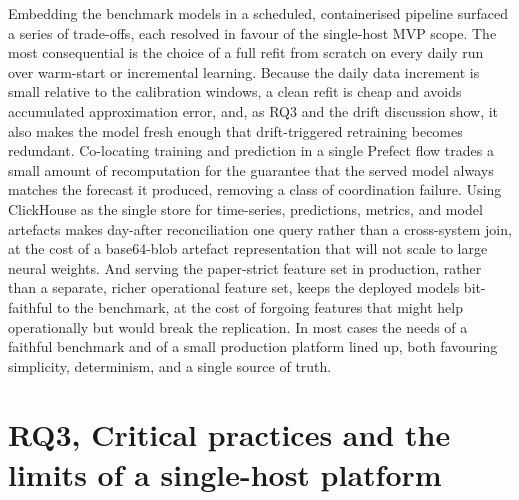 Embedding the benchmark models in a scheduled, containerised pipeline surfaced a
series of trade-offs, each resolved in favour of the single-host MVP scope. The
most consequential is the choice of a full refit from scratch on every daily run
over warm-start or incremental learning. Because the daily data increment is
small relative to the calibration windows, a clean refit is cheap and avoids
accumulated approximation error, and, as RQ3 and the drift discussion show,
it also makes the model fresh enough that drift-triggered retraining becomes
redundant. Co-locating training and prediction in a single Prefect flow trades a
small amount of recomputation for the guarantee that the served model always
matches the forecast it produced, removing a class of coordination failure. Using
ClickHouse as the single store for time-series, predictions, metrics, and model
artefacts makes day-after reconciliation one query rather than a cross-system
join, at the cost of a base64-blob artefact representation that will not scale to
large neural weights. And serving the paper-strict feature set in production,
rather than a separate, richer operational feature set, keeps the deployed
models bit-faithful to the benchmark, at the cost of forgoing features that might
help operationally but would break the replication. In most cases the needs of a
faithful benchmark and of a small production platform lined up, both favouring
simplicity, determinism, and a single source of truth.

\section{RQ3, Critical practices and the limits of a single-host platform}

